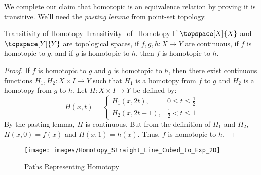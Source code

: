         We complete our claim that homotopic is an equivalence relation
        by proving it is transitive. We'll need the
        \textit{pasting lemma} from point-set topology.
        \begin{ltheorem}{Transitivity of Homotopy}
                        {Transitivity_of_Homotopy}
            If $\topspace[X]{X}$ and $\topspace[Y]{Y}$ are topological
            spaces, if $f,g,h:X\rightarrow{Y}$ are continuous, if $f$ is
            homotopic to $g$, and if $g$ is homotopic to $h$, then $f$
            is homotopic to $h$.
        \end{ltheorem}
        \begin{proof}
            If $f$ is homotopic to $g$ and $g$ is homotopic to $h$, then
            there exist continuous functions
            $H_{1},H_{2}:X\times{I}\rightarrow{Y}$ such that $H_{1}$ is
            a homotopy from $f$ to $g$ and $H_{2}$ is a homotopy from
            $g$ to $h$. Let $H:X\times{I}\rightarrow{Y}$ be defined by:
            \begin{equation}
                H(x,t)=
                \begin{cases}
                    H_{1}(x,2t),&{0}\leq{t}\leq\frac{1}{2}\\
                    H_{2}(x,2t-1),&\frac{1}{2}<{t}\leq{1}
                \end{cases}
            \end{equation}
            By the pasting lemma, $H$ is continuous. But from the
            definition of $H_{1}$ and $H_{2}$, $H(x,0)=f(x)$ and
            $H(x,1)=h(x)$. Thus, $f$ is homotopic to $h$.
        \end{proof}
        \begin{figure}
            \centering
            \captionsetup{type=figure}
            \texttt{[image: images/Homotopy\_Straight\_Line\_Cubed\_to\_Exp\_2D]}
            \caption{Paths Representing Homotopy}
            \label{fig:Paths_Representing_Homotopy}
        \end{figure}
